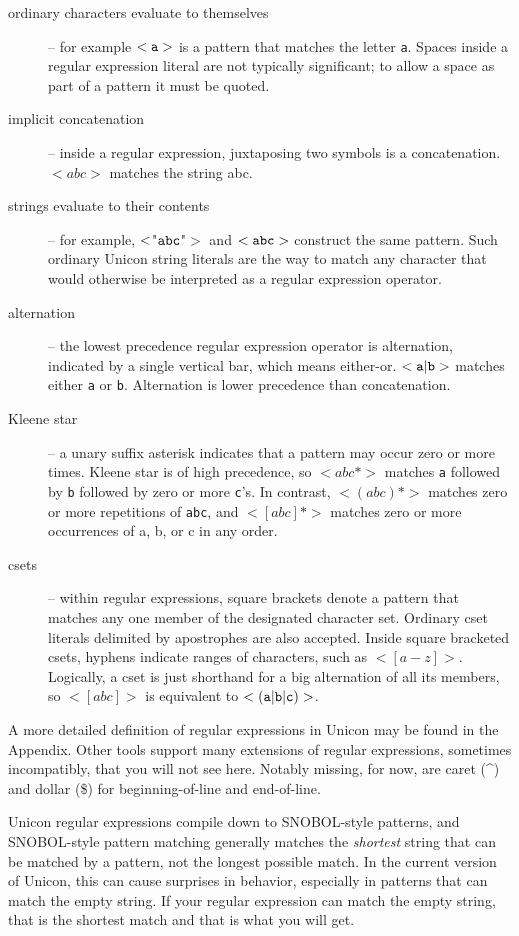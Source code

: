 \documentclass[letterpaper,12pt]{article}
\begin{document}
\begin{description}
\item [ordinary characters evaluate to themselves] -- for example
${\tt <a>}$ is a pattern that matches the letter {\tt a}.  Spaces
inside a regular expression literal are not typically significant;
to allow a space as part of a pattern it must be quoted.
\item [implicit concatenation] -- inside a regular expression,
juxtaposing two symbols is a concatenation. $<abc>$ matches the
string abc.
\item [strings evaluate to their contents] -- for example,
${\tt <}${\ttfamily"}${\tt abc}${\ttfamily"}$>$ and ${\tt <abc>}$
construct the same
pattern. Such ordinary Unicon string literals are the way to match any
character that would otherwise be interpreted as a regular
expression operator.
\item [alternation] -- the lowest precedence regular expression
operator is alternation, indicated by a single vertical bar, which
means either-or. ${\tt <a\vert b>}$ matches either {\tt a} or {\tt b}.
Alternation is lower precedence than concatenation.
\item [Kleene star] -- a unary suffix asterisk indicates that a
pattern may occur zero or more times. Kleene star is of high
precedence, so {\tt $<abc*>$} matches {\tt a} followed by {\tt b}
followed by zero or more {\tt c}'s. In contrast, {\tt $<(abc)*>$}
matches zero or more repetitions of {\tt abc}, and {\tt $<[abc]*>$}
matches zero or more occurrences of a, b, or c in any order.
\item [csets] -- within regular expressions, square brackets denote
a pattern that matches any one member of the designated character
set. Ordinary cset literals delimited by apostrophes are also accepted.
Inside square bracketed csets,
hyphens indicate ranges of characters, such as {\tt $<[a-z]>$}.  Logically,
a cset is just shorthand for a big alternation of all its members, so
{\tt $<[abc]>$} is equivalent to ${\tt <(a\vert b\vert c)>}$.

\end{description}

A more detailed definition of regular expressions in Unicon may be found
in the Appendix.  Other tools support many extensions of regular
expressions, sometimes incompatibly, that you will not see
here. Notably missing, for now, are caret (\^{}) and dollar (\$) for
beginning-of-line and end-of-line.

Unicon regular expressions compile down to SNOBOL-style patterns, and
SNOBOL-style pattern matching generally matches the {\em shortest\/}
string that can be matched by a pattern, not the longest possible
match.  In the current version of Unicon, this can cause surprises in
behavior, especially in patterns that can match the empty string. If
your regular expression can match the empty string, that is the
shortest match and that is what you will get.
\end{document}
